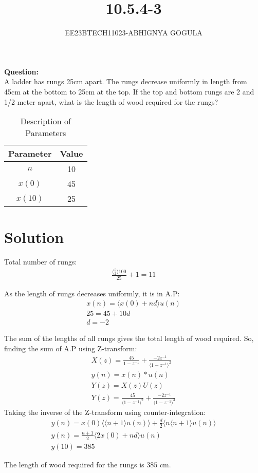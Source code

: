 \documentclass[journal,12pt,twocolumn]{IEEEtran}
\newcommand{\brak}[1]{\langle #1 \rangle}
\theoremstyle{remark}
\begin{document}

\vspace{3cm}
\title{\textbf{10.5.4-3}}
\author{EE23BTECH11023-ABHIGNYA GOGULA}
\maketitle
\newpage
\bigskip
\renewcommand{\thefigure}{\theenumi}
\renewcommand{\thetable}{\theenumi}
\textbf{Question:}
\\
 A ladder has rungs 25cm apart. The rungs decrease uniformly in length from 45cm at the bottom to 25cm at the top. If the top and bottom rungs are 2 and 1/2 meter apart, what is the length of wood required for the rungs?

\begin{table}[h]
\centering
\begin{tabular}{|c|c|}
\hline
Parameter & Value \\
\hline
$n$ & 10 \\
\hline
$x(0)$ & 45 \\
\hline
$x(10)$ & 25 \\
\hline
\end{tabular}
\caption{Description of Parameters}
\label{tab:parameter-values}
\end{table}

\section*{Solution}
Total number of rungs:
\begin{align}
\frac{\brak{\frac{5}{2}}100}{25}+1 = 11
\end{align}

As the length of rungs decreases uniformly, it is in A.P:
\begin{align}
x(n) = \brak{x(0) + nd}u(n) \\
25 = 45 + 10d \\
d = -2
\end{align}

The sum of the lengths of all rungs gives the total length of wood required. So, finding the sum of A.P using Z-transform:
\begin{align}
X(z) = \frac{45}{1-z^{-1}} + \frac{-2z^{-1}}{\brak{1-z^{-1}}^{2}}\\
y(n)=x(n)*u(n)\\
Y(z)=X(z)U(z)\\
Y(z)=\frac{45}{\brak{1-z^{-1}}^2}+ \frac{-2z^{-1}}{\brak{1-z^{-1}}^{3}}
\end{align}
Taking the inverse of the Z-transform using counter-integration:
\begin{align}
y(n) = x(0)\brak{\brak{n+1}u(n)}+\frac{d}{2}\brak{n\brak{n+1}u(n)} \\
y(n) = \frac{n+1}{2}\brak{2x(0)+nd}u(n) \\
y(10) = 385
\end{align}

The length of wood required for the rungs is $385$ cm.
\end{document}
